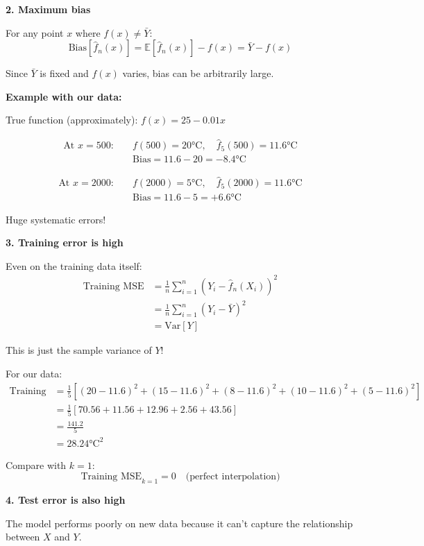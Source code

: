 \documentclass[12pt]{article}
\begin{document}
\begin{solution}
\textbf{2. Maximum bias}

For any point \(x\) where \(f(x) \neq \bar{Y}\):
\[
\text{Bias}[\hat{f}_n(x)] = \mathbb{E}[\hat{f}_n(x)] - f(x) = \bar{Y} - f(x)
\]

Since \(\bar{Y}\) is fixed and \(f(x)\) varies, bias can be arbitrarily large.

\textbf{Example with our data:}

True function (approximately): \(f(x) = 25 - 0.01x\)

\begin{align*}
\text{At } x = 500: \quad &f(500) = 20°\text{C}, \quad \hat{f}_5(500) = 11.6°\text{C} \\
&\text{Bias} = 11.6 - 20 = -8.4°\text{C}
\end{align*}

\begin{align*}
\text{At } x = 2000: \quad &f(2000) = 5°\text{C}, \quad \hat{f}_5(2000) = 11.6°\text{C} \\
&\text{Bias} = 11.6 - 5 = +6.6°\text{C}
\end{align*}

Huge systematic errors!

\textbf{3. Training error is high}

Even on the training data itself:
\begin{align*}
\text{Training MSE} &= \frac{1}{n}\sum_{i=1}^n (Y_i - \hat{f}_n(X_i))^2 \\
&= \frac{1}{n}\sum_{i=1}^n (Y_i - \bar{Y})^2 \\
&= \text{Var}[Y]
\end{align*}

This is just the sample variance of \(Y\)!

For our data:
\begin{align*}
\text{Training MSE} &= \frac{1}{5}[(20-11.6)^2 + (15-11.6)^2 + (8-11.6)^2 + (10-11.6)^2 + (5-11.6)^2] \\
&= \frac{1}{5}[70.56 + 11.56 + 12.96 + 2.56 + 43.56] \\
&= \frac{141.2}{5} \\
&= 28.24°\text{C}^2
\end{align*}

Compare with \(k=1\):
\[
\text{Training MSE}_{k=1} = 0 \quad \text{(perfect interpolation)}
\]

\textbf{4. Test error is also high}

The model performs poorly on new data because it can't capture the relationship between \(X\) and \(Y\).


\end{solution}
\end{document}
